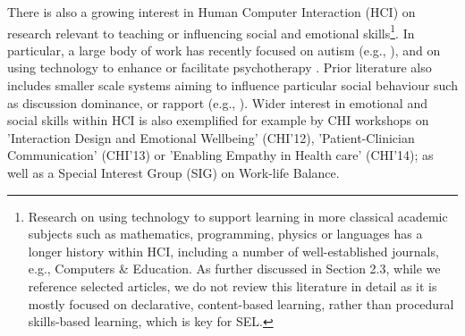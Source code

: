 \documentclass[prodmode,acmtochi]{acmsmall}
\begin{document}
There is also a growing interest in Human Computer Interaction (HCI) on research relevant to teaching or influencing social and emotional skills\footnote{Research on using technology to support learning in more classical academic subjects such as mathematics, programming, physics or languages  has a longer history within HCI, including a number of well-established journals, e.g., Computers \& Education. As further discussed in Section 2.3, while we reference selected articles, we do not review this literature in detail as it is mostly focused on declarative, content-based learning, rather than procedural skills-based learning, which is key for SEL.}. In particular, a large body of work has recently focused on autism (e.g., \cite{Escobedo2012,Porayska-Pomsta2011,Zarin2011,Tentori2010,Gotsis2010,Hong2012}), and on using technology to enhance or facilitate psychotherapy \cite{Coyle2011,Matthews2011,DeSa2010,Hancock2010}. Prior literature also includes smaller scale systems aiming to influence particular social behaviour such as discussion dominance, or rapport (e.g., \cite{Narumi2009,Piper2006,Balaam2011,Kim2008,McAtamney2006,Schroyen2008,Kim2008a,Toups2007,Kreitmayer2012,Daily2010,Munson2010}). 
%
%
Wider interest in emotional and social skills within HCI is also exemplified for example by CHI workshops on 'Interaction Design and Emotional Wellbeing' (CHI'12), 'Patient-Clinician Communication' (CHI'13) or 'Enabling Empathy in Health care' (CHI'14); as well as a Special Interest Group (SIG) on Work-life Balance. 

        

\end{document}
